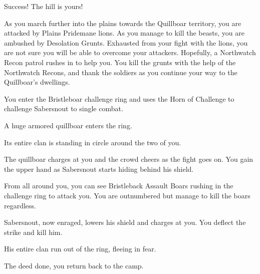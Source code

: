 Success! The hill is yours!

As you march further into the plains towards the Quillboar territory,  you are attacked by Plains Pridemane lions. As you manage to kill the beasts, you are ambushed by Desolation Grunts. Exhausted from your fight with the lions,  you are not sure you will be able to overcome your attackers. Hopefully, a Northwatch Recon patrol rushes in to help you. You kill the grunts with the help of the Northwatch Recons, and thank the soldiers as you continue your way to the Quillboar's dwellings.

You enter the Bristleboar challenge ring and uses the Horn of Challenge to challenge Sabersnout to single combat.

A huge armored quillboar enters the ring.


Its entire clan is standing in circle around the two of you.


The quillboar charges at you and the crowd cheers as the fight goes on. You gain the upper hand as Sabersnout starts hiding behind his shield.


From all around you, you can see Bristleback Assault Boars rushing in the challenge ring to attack you.  You are outnumbered but manage to kill the boars regardless.


Sabersnout, now enraged, lowers his shield and charges at you. You deflect the strike and kill him.


His entire clan run out of the ring, fleeing in fear.

The deed done, you return back to the camp.

